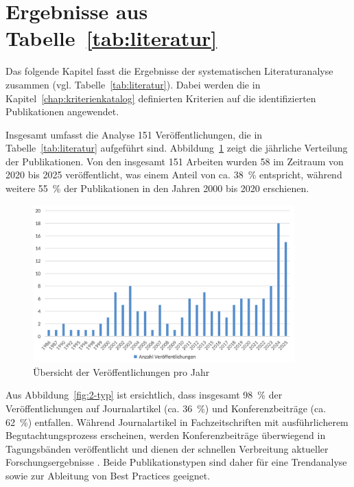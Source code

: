 \section{Ergebnisse aus Tabelle~\ref{tab:literatur}}

Das folgende Kapitel fasst die Ergebnisse der systematischen Literaturanalyse zusammen (vgl. Tabelle~\ref{tab:literatur}). Dabei werden die in Kapitel~\ref{chap:kriterienkatalog} definierten Kriterien auf die identifizierten Publikationen angewendet.

\vspace{1em}

Insgesamt umfasst die Analyse 151 Veröffentlichungen, die in Tabelle~\ref{tab:literatur} aufgeführt sind. Abbildung~\ref{fig:1-veroeffentlichungen-jahr} zeigt die jährliche Verteilung der Publikationen. Von den insgesamt 151 Arbeiten wurden 58 im Zeitraum von 2020 bis 2025 veröffentlicht, was einem Anteil von ca. 38~\% entspricht, während weitere 55~\% der Publikationen in den Jahren 2000 bis 2020 erschienen.

\begin{figure}[!htbp]
    \centering
    \includegraphics[width=0.90\textwidth]{graphics_lit/1-veroeffentlichungen-jahr.png}
    \caption{Übersicht der Veröffentlichungen pro Jahr}
    \label{fig:1-veroeffentlichungen-jahr}
\end{figure}

Aus Abbildung~\ref{fig:2-typ} ist ersichtlich, dass insgesamt 98~\% der Veröffentlichungen auf Journalartikel (ca. 36~\%) und Konferenzbeiträge (ca. 62~\%) entfallen. Während Journalartikel in Fachzeitschriften mit ausführlicherem Begutachtungsprozess erscheinen, werden Konferenzbeiträge überwiegend in Tagungsbänden veröffentlicht und dienen der schnellen Verbreitung aktueller Forschungsergebnisse \cite{abbadia_conference_2022}. Beide Publikationstypen sind daher für eine Trendanalyse sowie zur Ableitung von Best Practices geeignet.

